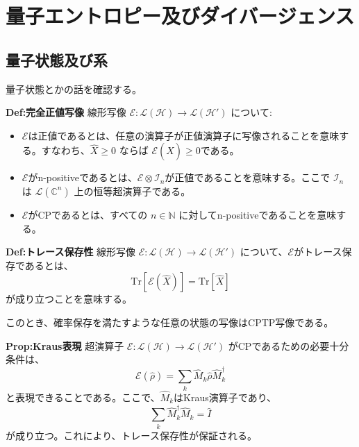 \documentclass[a4paper,11pt]{jsarticle}
\numberwithin{equation}{section}
\begin{document}
\newpage
\section{量子エントロピー及びダイバージェンス}
\subsection{量子状態及び系}
量子状態とかの話を確認する。\\

\begin{itembox}[l]{\textbf{Def:完全正値写像}}
    線形写像 $\mathcal{E} : \mathcal{L}(\mathcal{H}) \rightarrow \mathcal{L}(\mathcal{H}')$ について:

\begin{itemize}
  \item $\mathcal{E}$は正値であるとは、任意の演算子が正値演算子に写像されることを意味する。すなわち、$\hat{X} \geq 0$ ならば $\mathcal{E}(\hat{X}) \geq 0$である。
  \item $\mathcal{E}$がn-positiveであるとは、$\mathcal{E} \otimes \mathcal{I}_n$が正値であることを意味する。ここで $\mathcal{I}_n$ は $\mathcal{L}(\mathbb{C}^n)$ 上の恒等超演算子である。
  \item $\mathcal{E}$がCPであるとは、すべての $n \in \mathbb{N}$ に対してn-positiveであることを意味する。
\end{itemize}

\end{itembox}

\begin{itembox}[l]{\textbf{Def:トレース保存性}}
    線形写像 $\mathcal{E} : \mathcal{L}(\mathcal{H}) \rightarrow \mathcal{L}(\mathcal{H}')$ について、$\mathcal{E}$がトレース保存であるとは、
    \begin{equation}
        \text{Tr}[\mathcal{E}(\hat{X})] = \text{Tr}[\hat{X}]
    \end{equation}
    が成り立つことを意味する。
\end{itembox}
このとき、確率保存を満たすような任意の状態の写像はCPTP写像である。\\

\begin{itembox}[l]{\textbf{Prop:Kraus表現}}
    超演算子 $\mathcal{E} : \mathcal{L}(\mathcal{H}) \rightarrow \mathcal{L}(\mathcal{H}')$ がCPであるための必要十分条件は、
    \begin{equation}
        \mathcal{E}(\hat{\rho}) = \sum_{k} \hat{M}_k \hat{\rho} \hat{M}_k^{\dagger}
    \end{equation}
    と表現できることである。ここで、$\hat{M}_k$はKraus演算子であり、
    \begin{equation}
        \sum_{k} \hat{M}_k^{\dagger} \hat{M}_k = \hat{I}
    \end{equation}
    が成り立つ。これにより、トレース保存性が保証される。

\end{itembox}
\end{document}
